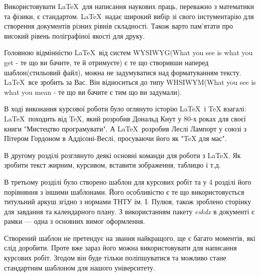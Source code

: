
Використовувати \LaTeX  \ для написання наукових праць, переважно з математики та фізики, є стандартом. \LaTeX \  надає широкий вибір зі свого інстументарію для створення документів різних рівнів складності. Також варто пам'ятати про високий рівень поліграфіної якості для друку. 

Головною відмінністю \LaTeX \ від систем WYSIWYG(What you see is what you get - те що ви бачите, те й отримуєте) є те що створивши наперед шаблон(стильовий файл), можна не задумуватися над форматуванням тексту. \LaTeX \  все зробить за Вас. Він відноситься до типу WHSIWYM(What you see is what you mean - те що ви бачите є тим що ви задумали). 

В ході виконання курсової роботи було оглянуто історію \LaTeX \ і TeX взагалі: \LaTeX \ походить від TeX, який розробив Дональд Кнут у 80-х роках для своєї книги "Мистецтво програмувати". А \LaTeX \ розробив Леслі Лампорт у союзі з Пітером Гордоном в Аддісоні-Веслі, просуваючи його як "TeX для мас".

В другому розділі розглянуто деякі основні команди для роботи з \LaTeX. Як зробити текст жирним, курсивом, вставити зображення, таблицю і т.д. 

В третьому розділі було створено шаблон для курсових робіт та у 4 розділі його порівняння з іншими шаблонами. Його особливістю є те що використовується титульний аркуш згідно з нормами ТНТУ ім. І. Пулюя, також зроблено сторінку для завдання та календарного плану. З використанням пакету \textit{eskdx} в документі є рамки --- одна з основних вимог оформлення.

Створений шаблон не претендує на звання найкращого, ще є багато моментів, які слід доробити. Проте вже зараз його можна використовувати для написання курсових робіт. Згодом він буде тільки поліпшуватися та можливо стане стандартним шаблоном для нашого університету.